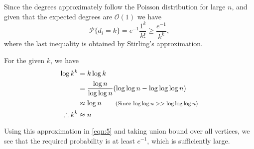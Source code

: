 \documentclass[11pt]{article}
\newenvironment{exercise}[2][Exercise]{\begin{trivlist}
\item[\hskip \labelsep {\bfseries #1}\hskip \labelsep {\bfseries #2.}]}{\end{trivlist}}
\newenvironment{solution}[1][Solution]{\begin{trivlist}
\item[\hskip \labelsep {\bfseries #1}\hskip \labelsep]}{\end{trivlist}}
\newcommand*{\annot}[1]{\tag*{\footnotesize{(#1)}}}
\begin{document}
\begin{exercise}{2.4.5}
\end{exercise}

\begin{solution}
Since the degrees approximately follow the Poisson distribution for large $n$, and given that the expected degrees are $\mathcal{O}(1)$ we have
\begin{equation}
\mathcal{P}\{ d_i = k \} = e^{-1}\frac{1^k}{k!} \geq \frac{e^{-1}}{k^k}, 
\label{eqn:5}
\end{equation}
where the last inequality is obtained by Stirling's approximation.

For the given $k$, we have
\begin{align*}
\log k^k &= k \log k \\
	&= \frac{\log n}{\log \log n}(\log \log n - \log \log \log n) \\
	&\approx \log n \annot{Since $\log \log n >> \log \log \log n$}\\
\therefore k^k &\approx n
\end{align*}

Using this approximation in \ref{eqn:5} and taking union bound over all vertices, we see that the required probability is at least $e^{-1}$, which is sufficiently large.
\end{solution}

\begin{exercise}{2.5.1}
\end{exercise}
\end{document}
